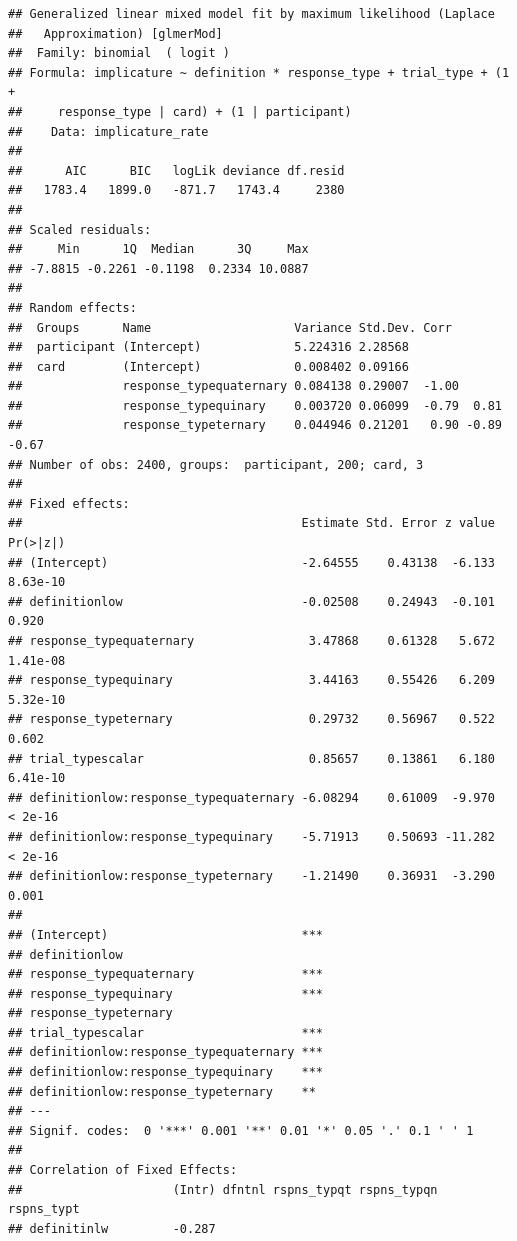 \documentclass[floatsintext,man]{apa6}
\theoremstyle{definition}
\theoremstyle{definition}
\theoremstyle{definition}
\theoremstyle{remark}
\begin{document}
\begin{verbatim}
## Generalized linear mixed model fit by maximum likelihood (Laplace
##   Approximation) [glmerMod]
##  Family: binomial  ( logit )
## Formula: implicature ~ definition * response_type + trial_type + (1 +  
##     response_type | card) + (1 | participant)
##    Data: implicature_rate
## 
##      AIC      BIC   logLik deviance df.resid 
##   1783.4   1899.0   -871.7   1743.4     2380 
## 
## Scaled residuals: 
##     Min      1Q  Median      3Q     Max 
## -7.8815 -0.2261 -0.1198  0.2334 10.0887 
## 
## Random effects:
##  Groups      Name                    Variance Std.Dev. Corr             
##  participant (Intercept)             5.224316 2.28568                   
##  card        (Intercept)             0.008402 0.09166                   
##              response_typequaternary 0.084138 0.29007  -1.00            
##              response_typequinary    0.003720 0.06099  -0.79  0.81      
##              response_typeternary    0.044946 0.21201   0.90 -0.89 -0.67
## Number of obs: 2400, groups:  participant, 200; card, 3
## 
## Fixed effects:
##                                       Estimate Std. Error z value Pr(>|z|)
## (Intercept)                           -2.64555    0.43138  -6.133 8.63e-10
## definitionlow                         -0.02508    0.24943  -0.101    0.920
## response_typequaternary                3.47868    0.61328   5.672 1.41e-08
## response_typequinary                   3.44163    0.55426   6.209 5.32e-10
## response_typeternary                   0.29732    0.56967   0.522    0.602
## trial_typescalar                       0.85657    0.13861   6.180 6.41e-10
## definitionlow:response_typequaternary -6.08294    0.61009  -9.970  < 2e-16
## definitionlow:response_typequinary    -5.71913    0.50693 -11.282  < 2e-16
## definitionlow:response_typeternary    -1.21490    0.36931  -3.290    0.001
##                                          
## (Intercept)                           ***
## definitionlow                            
## response_typequaternary               ***
## response_typequinary                  ***
## response_typeternary                     
## trial_typescalar                      ***
## definitionlow:response_typequaternary ***
## definitionlow:response_typequinary    ***
## definitionlow:response_typeternary    ** 
## ---
## Signif. codes:  0 '***' 0.001 '**' 0.01 '*' 0.05 '.' 0.1 ' ' 1
## 
## Correlation of Fixed Effects:
##                     (Intr) dfntnl rspns_typqt rspns_typqn rspns_typt
## definitinlw         -0.287                                          

\end{verbatim}
\end{document}
